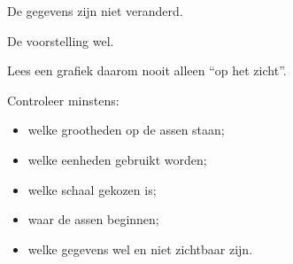 \documentclass{ximera}
\begin{document}
De gegevens zijn niet veranderd.

De voorstelling wel.

\begin{opmerking}
Lees een grafiek daarom nooit alleen ``op het zicht''.

Controleer minstens:

\begin{itemize}
  \item welke grootheden op de assen staan;
  \item welke eenheden gebruikt worden;
  \item welke schaal gekozen is;
  \item waar de assen beginnen;
  \item welke gegevens wel en niet zichtbaar zijn.
\end{itemize}
\end{opmerking}
\end{document}
